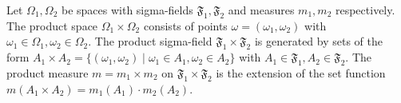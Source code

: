 Let $\Omega_1, \Omega_2$ be spaces with sigma-fields $\mathfrak{F}_1, \mathfrak{F}_2$ and measures $m_1, m_2$ respectively. The product space $\Omega_1 \times \Omega_2$ consists of points $\omega = (\omega_1, \omega_2)$ with $\omega_1 \in \Omega_1, \omega_2 \in \Omega_2$. The product sigma-field $\mathfrak{F}_1 \times \mathfrak{F}_2$ is generated by sets of the form $A_1 \times A_2 = \{(\omega_1, \omega_2) \mid \omega_1 \in A_1, \omega_2 \in A_2\}$ with $A_1 \in \mathfrak{F}_1, A_2 \in \mathfrak{F}_2$. The product measure $m = m_1 \times m_2$ on $\mathfrak{F}_1 \times \mathfrak{F}_2$ is the extension of the set function $m(A_1 \times A_2) = m_1(A_1) \cdot m_2(A_2)$.
